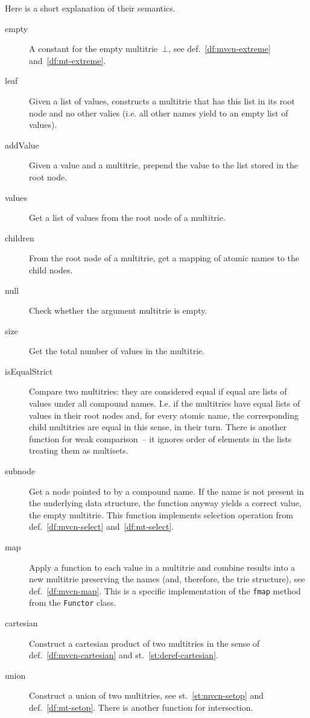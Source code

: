 \documentclass{article}
\theoremstyle{definition}
\begin{document}
Here is a short explanation of their semantics.
\begin{description}
\item [empty]
  A constant for the empty multitrie~$\bot$, see def.~\ref{df:mvcn-extreme}
  and~\ref{df:mt-extreme}.
\item [leaf] Given a list of values, constructs a multitrie that has this list
  in its root node and no other valies (i.e. all other names yield to an empty
  list of values).
\item [addValue]
  Given a value and a multitrie, prepend the value to the list stored in the
  root node.
\item [values]
  Get a list of values from the root node of a multitrie.
\item [children]
  From the root node of a multitrie, get a mapping of atomic names to the
  child nodes.
\item [null]
  Check whether the argument multitrie is empty.
\item [size]
  Get the total number of values in the multitrie.
\item [isEqualStrict]
  Compare two multitries: they are considered equal if equal are lists of
  values under all compound names. I.e. if the multitries have equal lists
  of values in their root nodes and, for every atomic name, the corresponding
  child multitries are equal in this sense, in their turn. There is another
  function for weak comparison~-- it ignores order of elements in the lists
  treating them as multisets.
\item [subnode]
  Get a node pointed to by a compound name. If the name is not present in the
  underlying data structure, the function anyway yields a correct value, the
  empty multitrie. This function implements selection operation from
  def.~\ref{df:mvcn-select} and~\ref{df:mt-select}.
\item [map]
  Apply a function to each value in a multitrie and combine results into
  a new multitrie preserving the names (and, therefore, the trie structure),
  see def.~\ref{df:mvcn-map}.
  This is a specific implementation of the \lstinline{fmap} method from the
  \lstinline{Functor} class.
\item [cartesian]
  Construct a cartesian product of two multitries in the sense of
  def.~\ref{df:mvcn-cartesian} and st.~\ref{st:deref-cartesian}.
\item [union]
  Construct a union of two multitries, see st.~\ref{st:mvcn-setop} and
  def.~\ref{df:mt-setop}. There is another function for intersection.

\end{description}
\end{document}

